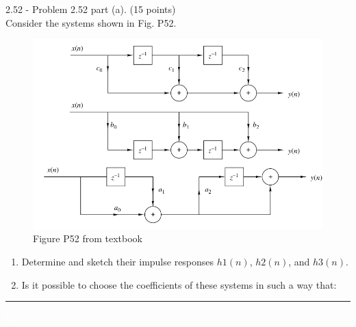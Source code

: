 \documentclass[a4paper, 11pt]{exam}
\begin{document}
\section{}
2.52 - Problem 2.52 part (a). (15 points)\\
Consider the systems shown in Fig. P52.\\
\begin{figure}[ht!]
  \centering
  \includegraphics[width=14cm]{figures/fig52.png}
  \caption{Figure P52 from textbook}
    \label{fig:number52_fromText}
\end{figure}
\begin{enumerate}
\item Determine and sketch their impulse responses $h1 (n)$, $h2 (n)$, and $h3 (n)$.
\item Is it possible to choose the coefficients of these systems in such a way that: 
\end{enumerate}
\hrule
\newpage
\textcolor{white}{ test }

\vspace{2em}
\end{document}
